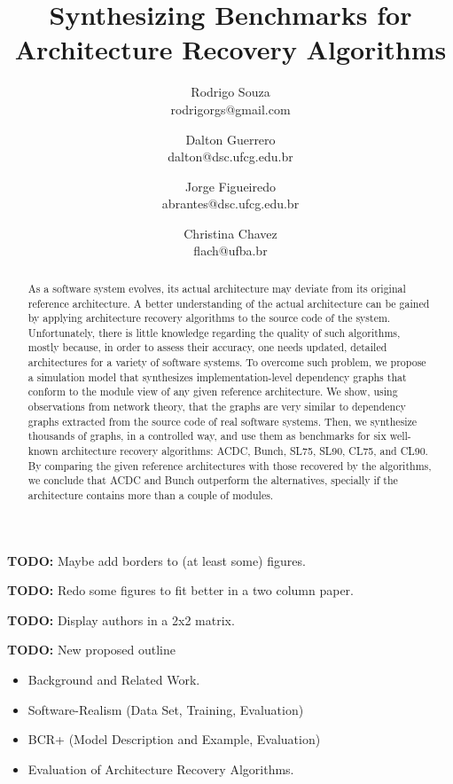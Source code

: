 \documentclass[11pt,twocolumn,a4paper,english]{article}
\title{
Synthesizing Benchmarks for Architecture Recovery Algorithms}
\author{Rodrigo Souza \\ rodrigorgs@gmail.com 
\and Dalton Guerrero \\ dalton@dsc.ufcg.edu.br
\and Jorge Figueiredo \\ abrantes@dsc.ufcg.edu.br
\and Christina Chavez \\ flach@ufba.br
}
\newcommand{\TODO}{\textbf{TODO:} }
\begin{document}
\sloppy
\maketitle

\tableofcontents
\vspace{1 em}

\TODO Maybe add borders to (at least some) figures.

\TODO Redo some figures to fit better in a two column paper.

\TODO Display authors in a 2x2 matrix.


\TODO New proposed outline
\begin{itemize}
	\item Background and Related Work.

	\item Software-Realism (Data Set, Training, Evaluation)
	
	\item BCR+ (Model Description and Example, Evaluation)
	
	\item Evaluation of Architecture Recovery Algorithms.
	
\end{itemize}


\begin{abstract}
	As a software system evolves, its actual architecture may deviate from its original reference architecture. A better understanding of the actual architecture can be gained by applying architecture recovery algorithms to the source code of the system. Unfortunately, there is little knowledge regarding the quality of such algorithms, mostly because, in order to assess their accuracy, one needs updated, detailed architectures for a variety of software systems.
	To overcome such problem, we propose a simulation model that synthesizes implementation-level dependency graphs that conform to the module view of any given reference architecture. We show, using observations from network theory, that the graphs are very similar to dependency graphs extracted from the source code of real software systems. 
	Then, we synthesize thousands of graphs, in a controlled way, and use them as benchmarks for six well-known architecture recovery algorithms: ACDC, Bunch, SL75, SL90, CL75, and CL90. By comparing the given reference architectures with those recovered by the algorithms, we conclude that ACDC and Bunch outperform the alternatives, specially if the architecture contains more than a couple of modules.\end{abstract}
\end{document}
